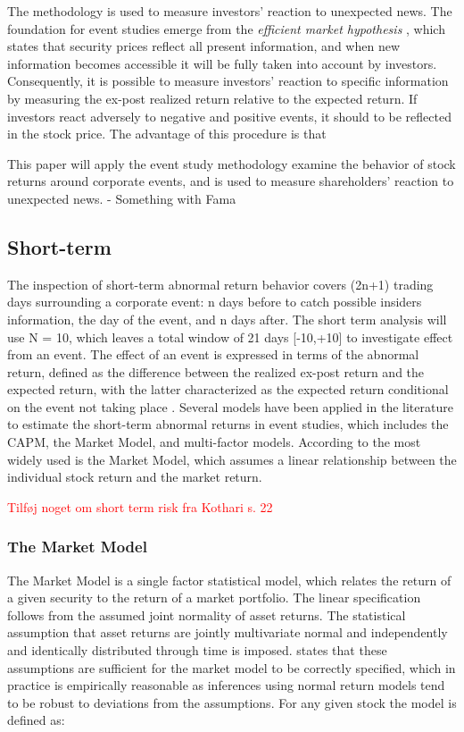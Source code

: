 The methodology is used to measure investors' reaction to unexpected news. The foundation for event studies emerge from the \textit{efficient market hypothesis} \citep{fama1969_EMH}, which states that security prices reflect all present information, and when new information becomes accessible it will be fully taken into account by investors. Consequently, it is possible to measure investors' reaction to specific information by measuring the ex-post realized return relative to the expected return. If investors react adversely to negative and positive events, it should to be reflected in the stock price. The advantage of this procedure is that 


This paper will apply the event study methodology examine the behavior of stock returns around corporate events, and is used to measure shareholders' reaction to unexpected news. 
- Something with Fama



\subsection{Short-term}

The inspection of short-term abnormal return behavior covers (2n+1) trading days surrounding a corporate event: n days before to catch possible insiders information, the day of the event, and n days after. The short term analysis will use N = 10, which leaves a total window of 21 days [-10,+10] to investigate effect from an event. The effect of an event is expressed in terms of the abnormal return, defined as the difference between the realized ex-post return and the expected return, with the latter characterized as the expected return conditional on the event not taking place \citep{Event_studies}. Several models have been applied in the literature to estimate the short-term abnormal returns in event studies, which includes the CAPM, the Market Model, and multi-factor models. According to \cite{holler2014event} the most widely used is the Market Model, which assumes a linear relationship between the individual stock return and the market return. 

 \textcolor{red}{Tilføj noget om short term risk fra Kothari s. 22} 

\subsubsection{The Market Model}

The Market Model is a single factor statistical model, which relates the return of a given security to the return of a market portfolio. The linear specification follows from the assumed joint normality of asset returns. The statistical assumption that asset returns are jointly multivariate normal and independently and identically distributed through time is imposed. \cite{Event_studies} states that these assumptions are sufficient for the market model to be correctly specified, which in practice is empirically reasonable as inferences using normal return models tend to be robust to deviations from the assumptions.    For any given stock the model is defined as:

